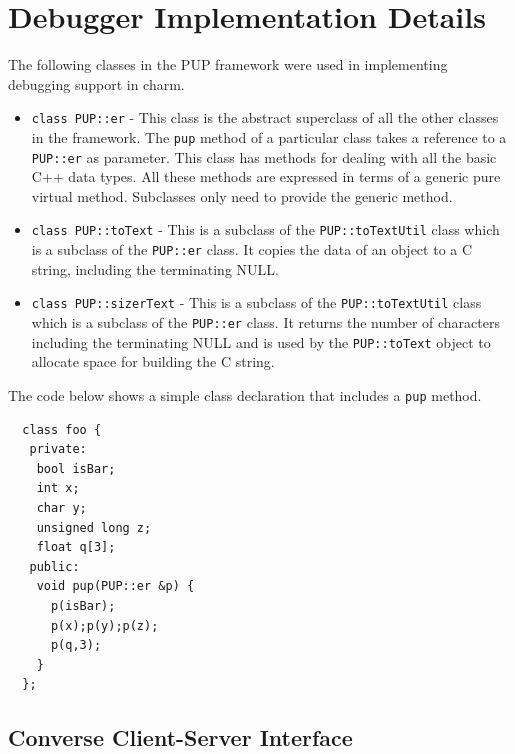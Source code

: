 \documentclass[10pt,dvips]{article}
\begin{document}
\section{Debugger Implementation Details}

The following classes in the PUP framework were used in
implementing debugging support in charm.


\begin{itemize}

\item

\texttt{class PUP::er} - This class is the abstract superclass of
all the other classes in the framework. The \texttt{pup} method of
a particular class takes a reference to a \texttt{PUP::er} as
parameter. This class has methods for dealing with all the basic
C++ data types. All these methods are expressed in terms of a
generic pure virtual method. Subclasses only need to provide the
generic method.

\item

\texttt{class PUP::toText} - This is a subclass of the
\texttt{PUP::toTextUtil} class which is a subclass of the
\texttt{PUP::er} class. It copies the data of an object to a C
string, including the terminating NULL.

\item

\texttt{class PUP::sizerText} - This is a subclass of the
\texttt{PUP::toTextUtil} class which is a subclass of the
\texttt{PUP::er} class. It returns the number of characters
including the terminating NULL and is used by the
\texttt{PUP::toText} object to allocate space for building the C
string.

\end{itemize}


The code below shows a simple class declaration
that includes a \texttt{pup} method.


\begin{verbatim}
  class foo {
   private:
    bool isBar;
    int x;
    char y;
    unsigned long z;
    float q[3];
   public:
    void pup(PUP::er &p) {
      p(isBar);
      p(x);p(y);p(z);
      p(q,3);
    }
  };
\end{verbatim}


\subsection{Converse Client-Server Interface}
\end{document}
